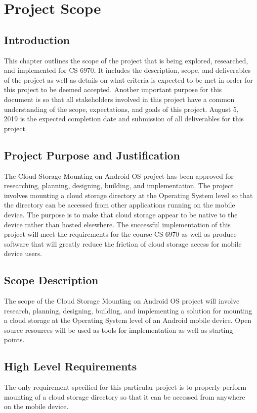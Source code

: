 \chapter{Project Scope} \cite{scopetemplate}
\label{projscope}

\section{Introduction}
This chapter outlines the scope of the project that is being explored, researched, and implemented for CS 6970. It includes the description, scope, and deliverables of the project as well as details on what criteria is expected to be met in order for this project to be deemed accepted. Another important purpose for this document is so that all stakeholders involved in this project have a common understanding of the scope, expectations, and goals of this project. August 5, 2019 is the expected completion date and submission of all deliverables for this project.

\section{Project Purpose and Justification}
The Cloud Storage Mounting on Android OS project has been approved for researching, planning, designing, building, and implementation. The project involves mounting a cloud storage directory at the Operating System level so that the directory can be accessed from other applications running on the mobile device. The purpose is to make that cloud storage appear to be native to the device rather than hosted elsewhere. The successful implementation of this project will meet the requirements for the course CS 6970 as well as produce software that will greatly reduce the friction of cloud storage access for mobile device users.

\section{Scope Description}
The scope of the Cloud Storage Mounting on Android OS project will involve research, planning, designing, building, and implementing a solution for mounting a cloud storage at the Operating System level of an Android mobile device. Open source resources will be used as tools for implementation as well as starting points.

\section{High Level Requirements}
The only requirement specified for this particular project is to properly perform mounting of a cloud storage directory so that it can be accessed from anywhere on the mobile device.

